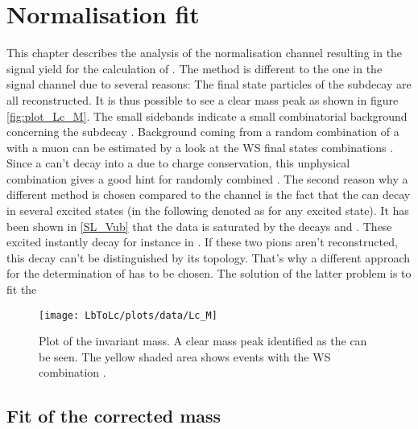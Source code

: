 \chapter{Normalisation fit}
\label{sec:Normalisationfit}

This chapter describes the analysis of the normalisation channel \LbToLcmunu resulting in the signal yield \NLc for the calculation of \R. The method is different to the one in the signal channel \LbToDpmunuX due to several reasons:
The final state particles of the subdecay \LcTopKpi are all reconstructed. 
It is thus possible to see a clear \Lc mass peak as shown in figure \ref{fig:plot_Lc_M}.
The small sidebands indicate a small combinatorial background concerning the subdecay \LcTopKpi.
Background coming from a random combination of a \Lc with a muon can be estimated by a look at the WS final states combinations \Lc\mup.
Since a \Lb can't decay into a \Lc\mup due to charge conservation, this unphysical combination gives a good hint for randomly combined \Lc\mun.
The second reason why a different method is chosen compared to the \LbToDpmunuX channel is the fact that the \Lb can decay in several excited \Lc states (in the following denoted as \Lcstar for any excited \Lc state).
It has been shown in \ref{SL_Vub} that the \LbToLcmunu data is saturated by the decays  and .
These excited \Lcstar instantly decay for instance in \Lc\pip\pim. 
If these two pions aren't reconstructed, this decay can't be distinguished by its topology.
That's why a different approach for the determination of \NLc has to be chosen.
The solution of the latter problem is to fit the 
\begin{figure}[hptb]
    \centering
	\texttt{[image: LbToLc/plots/data/Lc\_M]}	
	\caption{Plot of the invariant \pKpi mass. A clear mass peak identified as the \Lc can be seen. The yellow shaded area shows events with the WS combination \Lc\mup.}
	\label{fig:plot/Lc_M}
\end{figure}

\section{Fit of the \pKpi\mun corrected mass}
\label{sec:FitCorrectedMass}
